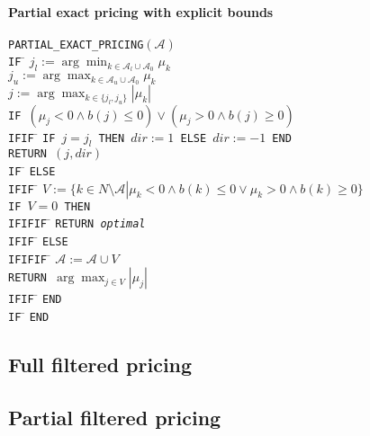 \documentclass[a4paper]{article}
\begin{document}
\paragraph{Partial exact pricing with explicit bounds}
\begin{tabbing}
\texttt{PARTIAL\_EXACT\_PRICING$(\mathcal{A})$} \\
\texttt{IF} \= \kill
\> \texttt{$j_{l}:=\arg\min_{k \in \mathcal{A}_{l} \cup
                               \mathcal{A}_{0}}\mu_{k}$}  \\
\> \texttt{$j_{u}:=\arg\max_{k \in \mathcal{A}_{u} \cup
                               \mathcal{A}_{0}}\mu_{k}$}  \\
\> \texttt{$j:=\arg\max_{k \in \{j_{l}, j_{u}\}}\left|\mu_{k}\right|$}  \\
\> \texttt{IF $\left(\mu_{j} < 0 \wedge b\left(j\right) \leq 0 \right)
   \vee \left(\mu_{j} > 0 \wedge b\left(j\right) \geq 0 \right)$} \\
\texttt{IFIF} \= \kill
\> \texttt{IF $j=j_{l}$ THEN $dir:=1$ ELSE $dir:=-1$ END} \\
\> \texttt{RETURN $(j, dir)$} \\
\texttt{IF} \= \kill
\> \texttt{ELSE} \\
\texttt{IFIF} \= \kill
\> \texttt{$V:=\{k \in N \setminus \mathcal{A} \left|\right.
    \mu_{k} < 0 \wedge b\left(k\right) \leq 0 \vee
    \mu_{k} > 0 \wedge b\left(k\right) \geq 0\}$} \\
\> \texttt{IF $V=0$ THEN} \\
\texttt{IFIFIF} \= \kill  
\> \texttt{RETURN \emph{optimal}} \\
\texttt{IFIF} \= \kill
\> \texttt{ELSE} \\
\texttt{IFIFIF} \= \kill
\> \texttt{$\mathcal{A}:=\mathcal{A} \cup V$} \\
\> \texttt{RETURN $\arg\max_{j \in V}\left|\mu_{j}\right|$} \\
\texttt{IFIF} \= \kill
\> \texttt{END} \\
\texttt{IF} \= \kill
\> \texttt{END}
\end{tabbing}
\subsection{Full filtered pricing}
\subsection{Partial filtered pricing}
\end{document}
